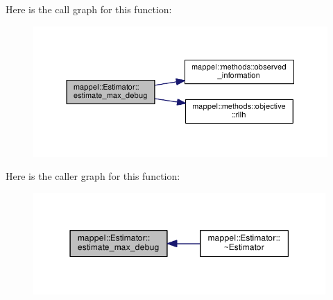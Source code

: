 Here is the call graph for this function\+:\nopagebreak
\begin{figure}[H]
\begin{center}
\leavevmode
\includegraphics[width=350pt]{classmappel_1_1Estimator_a4a581372a320f1c13eeffacf6309911b_cgraph}
\end{center}
\end{figure}




Here is the caller graph for this function\+:\nopagebreak
\begin{figure}[H]
\begin{center}
\leavevmode
\includegraphics[width=316pt]{classmappel_1_1Estimator_a4a581372a320f1c13eeffacf6309911b_icgraph}
\end{center}
\end{figure}



